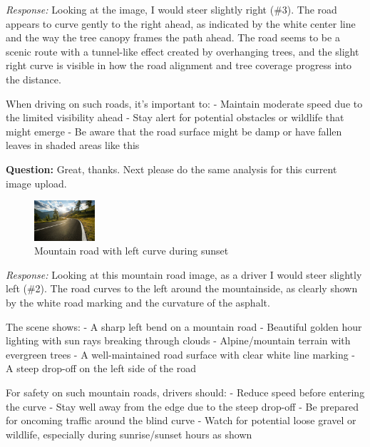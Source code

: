 \textit{Response:} Looking at the image, I would steer slightly right (\#3). The road appears to curve gently to the right ahead, as indicated by the white center line and the way the tree canopy frames the path ahead. The road seems to be a scenic route with a tunnel-like effect created by overhanging trees, and the slight right curve is visible in how the road alignment and tree coverage progress into the distance.

When driving on such roads, it's important to:
- Maintain moderate speed due to the limited visibility ahead
- Stay alert for potential obstacles or wildlife that might emerge
- Be aware that the road surface might be damp or have fallen leaves in shaded areas like this

\textbf{Question:} Great, thanks. Next please do the same analysis for this current image upload.

\begin{figure}[h]
\centering
\includegraphics[width=0.2\textwidth]{Figures/Methods-03-04/mountain_road.jpg}
\caption{Mountain road with left curve during sunset}
\label{fig:road2}
\end{figure}

\textit{Response:} Looking at this mountain road image, as a driver I would steer slightly left (\#2). The road curves to the left around the mountainside, as clearly shown by the white road marking and the curvature of the asphalt. 

The scene shows:
- A sharp left bend on a mountain road
- Beautiful golden hour lighting with sun rays breaking through clouds
- Alpine/mountain terrain with evergreen trees
- A well-maintained road surface with clear white line marking
- A steep drop-off on the left side of the road

For safety on such mountain roads, drivers should:
- Reduce speed before entering the curve
- Stay well away from the edge due to the steep drop-off
- Be prepared for oncoming traffic around the blind curve
- Watch for potential loose gravel or wildlife, especially during sunrise/sunset hours as shown




